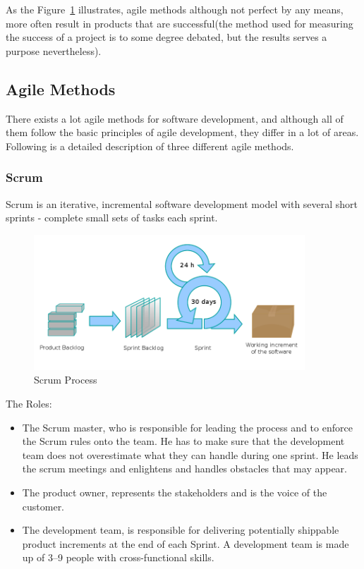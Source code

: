 As the Figure~\ref{figure:devchart} illustrates, agile methods although not perfect by any means, more often result in products that are successful(the method used for measuring the success of a project is to some degree debated, but the results serves a purpose nevertheless).

\subsection{Agile Methods}
There exists a lot agile methods for software development, and although all of them follow the basic principles of agile development, they differ in a lot of areas. Following is a detailed description of three different agile methods.

\subsubsection{Scrum}
Scrum is an iterative, incremental software development model with several short sprints - complete small sets of tasks each sprint.

\begin{figure}
\centering
\includegraphics[width=4in]{image/Scrum_process.png}
\caption{Scrum Process}
\label{figure:devchart}
\end{figure}


The Roles: 
\begin{itemize}

\item The Scrum master, who is responsible for leading the process and to enforce the Scrum rules onto the team. He has to make sure that the development team does not overestimate what they can handle during one sprint. He leads the scrum meetings and enlightens and handles obstacles that may appear. 

\item The product owner, represents the stakeholders and is the voice of the customer.

\item The development team, is responsible for delivering potentially shippable product increments at the end of each Sprint. A development team is made up of 3–9 people with cross-functional skills.

\end{itemize}

